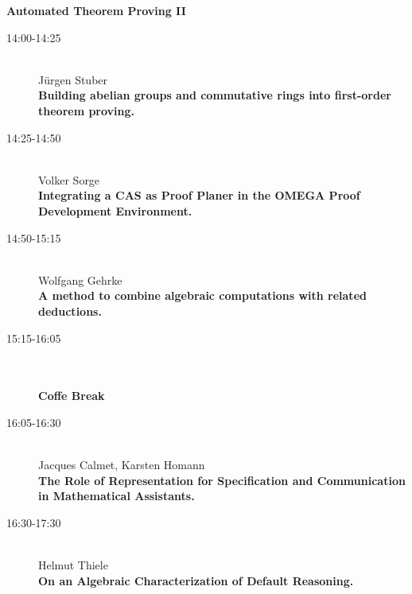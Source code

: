 \newpage

\begin{center}
{\Large \bf Automated Theorem Proving II
}
\end{center}


\begin{description}
\item[14:00-14:25] \ \\ 
  J\"urgen Stuber\\
  {\bf Building abelian groups and commutative rings into first-order
    theorem proving.} 
\item[14:25-14:50] \ \\ 
  Volker Sorge\\
  {\bf Integrating a CAS as Proof Planer in the OMEGA Proof
    Development Environment.}  
\item[14:50-15:15] \ \\ 
  Wolfgang Gehrke\\
  {\bf A method to combine algebraic computations with related deductions.} 
\item[15:15-16:05] \ \\
  \ \\
  {\bf Coffe Break}
\item[16:05-16:30] \ \\ 
  Jacques Calmet, Karsten Homann\\
  {\bf The Role of Representation for Specification and Communication
    in Mathematical Assistants.}
\item[16:30-17:30] \ \\ 
  Helmut Thiele\\
  {\bf On an Algebraic Characterization of Default Reasoning.}
\end{description}

